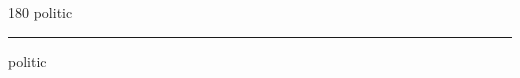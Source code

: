 
\begin{frame}
\begin{center}
\begin{turn}{180}
{\fontsize{2.5cm}{1em}\selectfont politic}
\end{turn}
\vspace{1em}\par  
\hrule
\vspace{1em}\par  
{\fontsize{2.5cm}{1em}\selectfont politic}
\end{center}
\end{frame}
